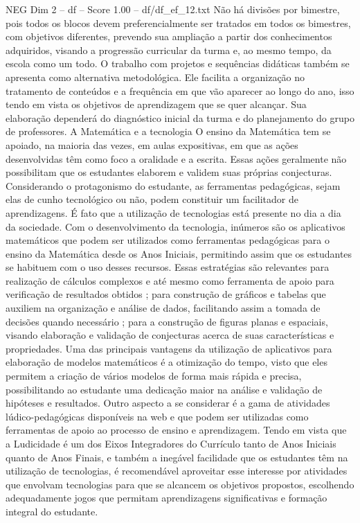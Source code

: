\begin{textsample}{NEG Dim 2 – df – Score 1.00 – df/df\_ef\_12.txt}
Não há divisões por bimestre, pois todos os blocos devem preferencialmente ser tratados em todos os bimestres, com objetivos diferentes, prevendo sua ampliação a partir dos conhecimentos adquiridos, visando a progressão curricular da turma e, ao mesmo tempo, da escola como um todo.
O trabalho com projetos e sequências didáticas também se apresenta como alternativa metodológica.
Ele facilita a organização no tratamento de conteúdos e a frequência em que vão aparecer ao longo do ano, isso tendo em vista os objetivos de aprendizagem que se quer alcançar.
Sua elaboração dependerá do diagnóstico inicial da turma e do planejamento do grupo de professores.
A Matemática e a tecnologia O ensino da Matemática tem se apoiado, na maioria das vezes, em aulas expositivas, em que as ações desenvolvidas têm como foco a oralidade e a escrita.
Essas ações geralmente não possibilitam que os estudantes elaborem e validem suas próprias conjecturas.
Considerando o protagonismo do estudante, as ferramentas pedagógicas, sejam elas de cunho tecnológico ou não, podem constituir um facilitador de aprendizagens.
É fato que a utilização de tecnologias está presente no dia a dia da sociedade.
Com o desenvolvimento da tecnologia, inúmeros são os aplicativos matemáticos que podem ser utilizados como ferramentas pedagógicas para o ensino da Matemática desde os Anos Iniciais, permitindo assim que os estudantes se habituem com o uso desses recursos.
Essas estratégias são relevantes para realização de cálculos complexos e até mesmo como ferramenta de apoio para verificação de resultados obtidos ; para construção de gráficos e tabelas que auxiliem na organização e análise de dados, facilitando assim a tomada de decisões quando necessário ; para a construção de figuras planas e espaciais, visando elaboração e validação de conjecturas acerca de suas características e propriedades.
Uma das principais vantagens da utilização de aplicativos para elaboração de modelos matemáticos é a otimização do tempo, visto que eles permitem a criação de vários modelos de forma mais rápida e precisa, possibilitando ao estudante uma dedicação maior na análise e validação de hipóteses e resultados.
Outro aspecto a se considerar é a gama de atividades lúdico-pedagógicas disponíveis na web e que podem ser utilizadas como ferramentas de apoio ao processo de ensino e aprendizagem.
Tendo em vista que a Ludicidade é um dos Eixos Integradores do Currículo tanto de Anos Iniciais quanto de Anos Finais, e também a inegável facilidade que os estudantes têm na utilização de tecnologias, é recomendável aproveitar esse interesse por atividades que envolvam tecnologias para que se alcancem os objetivos propostos, escolhendo adequadamente jogos que permitam aprendizagens significativas e formação integral do estudante.

\end{textsample}
